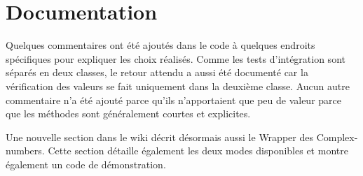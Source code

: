 \section{Documentation}

Quelques commentaires ont été ajoutés dans le code à quelques endroits spécifiques pour expliquer les choix réalisés. Comme les tests d'intégration sont séparés en deux classes, le retour attendu a aussi été documenté car la vérification des valeurs se fait uniquement dans la deuxième classe. Aucun autre commentaire n'a été ajouté parce qu'ils n'apportaient que peu de valeur parce que les méthodes sont généralement courtes et explicites.

Une nouvelle section dans le wiki décrit désormais aussi le \gls{Wrapper} des \glspl{Complex-number}. Cette section détaille également les deux modes disponibles et montre également un code de démonstration.